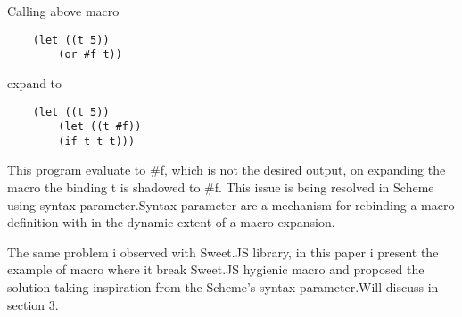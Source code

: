 Calling above macro 
\begin{lstlisting}
 	(let ((t 5))
  		(or #f t))
\end{lstlisting} 
  expand to 

\begin{lstlisting} 
  	(let ((t 5))
  		(let ((t #f))
    	(if t t t)))
\end{lstlisting} 
    
    This program evaluate to \#f, which is not the desired output, on expanding the macro the binding t is shadowed to \#f. This issue is being resolved in Scheme using syntax-parameter.Syntax parameter are a mechanism for rebinding a macro definition with in the dynamic extent of a macro expansion.

The same problem i observed with Sweet.JS library, in this paper i present the example of macro where it break Sweet.JS hygienic macro and proposed the solution taking inspiration from the Scheme's syntax parameter.Will discuss in section 3.